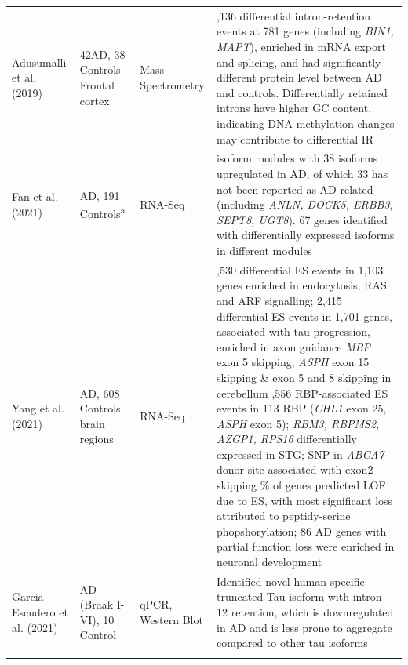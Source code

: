 \begin{changemargin}{1.5cm}
\begin{landscape}
\begin{longtable}[c]{p{3cm}p{4cm}p{3cm}p{16cm}}
			\centering Adusumalli et al. (2019) \cite{Adusumalli2019} &
			\centering 42AD, 38 Controls\cite{Bai2013} \newline Frontal cortex &
			\centering Mass Spectrometry &
			\tabitem 1,136 differential intron-retention events at 781 genes (including \textit{BIN1, MAPT}), enriched in mRNA export and splicing, and had significantly different protein level between AD and controls.
			\tabitem Differentially retained introns have higher GC content, indicating DNA methylation changes may contribute to differential IR \\
			\hdashline[0.5pt/5pt]
			\centering Fan et al. (2021) \cite{Fan2021} &
			\centering 210 AD, 191 Controls\textsuperscript{a} &
			\centering RNA-Seq &
			\tabitem 2 isoform modules with 38 isoforms upregulated in AD, of which 33 has not been reported as AD-related (including \textit{ANLN, DOCK5, ERBB3, SEPT8, UGT8}). 67 genes identified with differentially expressed isoforms in different modules  \\
			\hdashline[0.5pt/5pt]
			
			\centering Yang et al. (2021) \cite{Yang2021} &
			\centering 1074 AD, 608 Controls \newline 9 brain regions&
			\centering RNA-Seq & 
			\tabitem 1,530 differential ES events in 1,103 genes enriched in endocytosis, RAS and ARF signalling; 2,415 differential ES events in 1,701 genes, associated with tau progression, enriched in axon guidance \newline 
			\tabitem \textit{MBP} exon 5 skipping; \textit{ASPH} exon 15 skipping \& exon 5 and 8 skipping in cerebellum \newline  
			\tabitem 15,556 RBP-associated ES events in 113 RBP (\textit{CHL1} exon 25, \textit{ASPH} exon 5); \textit{RBM3, RBPMS2, AZGP1, RPS16} differentially expressed in STG; SNP in \textit{ABCA7} donor site associated with exon2 skipping \newline 
			\tabitem 70\% of genes predicted LOF due to ES, with most significant loss attributed to peptidy-serine phopshorylation; 86 AD genes with partial function loss were enriched in neuronal development	\\
			\hdashline[0.5pt/5pt]		
			
			\centering Garcia-Escudero et al. (2021) \cite{Garcia-Escudero2021} &
			\centering 32 AD (Braak I-VI), 10 Control &
			\centering qPCR, Western Blot &
			Identified novel human-specific truncated Tau isoform with intron 12 retention, which is downregulated in AD and is less prone to aggregate compared to other tau isoforms \\
			\hdashline[0.5pt/5pt]
			

\end{longtable}
\end{landscape}
\end{changemargin}
